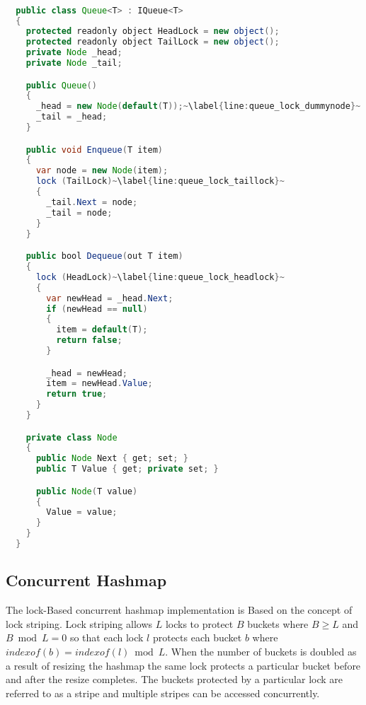 \begin{lstlisting}[label=lst:impl_queue_lock,
  caption={Lock Based Concurrent Queue Implementation},
  language=Java,  
  showspaces=false,
  showtabs=false,
  breaklines=true,
  showstringspaces=false,
  breakatwhitespace=true,
  commentstyle=\color{greencomments},
  keywordstyle=\color{bluekeywords},
  stringstyle=\color{redstrings},
  escapechar=~,
  morekeywords={atomic, retry, orelse, var, get, set, ref, out, readonly, virtual, override, lock}]  % Start your code-block

  public class Queue<T> : IQueue<T>
  {
    protected readonly object HeadLock = new object();
    protected readonly object TailLock = new object();
    private Node _head;
    private Node _tail;

    public Queue()
    {
      _head = new Node(default(T));~\label{line:queue_lock_dummynode}~
      _tail = _head;
    }

    public void Enqueue(T item)
    {
      var node = new Node(item);
      lock (TailLock)~\label{line:queue_lock_taillock}~
      {
        _tail.Next = node;
        _tail = node;
      }
    }

    public bool Dequeue(out T item)
    {
      lock (HeadLock)~\label{line:queue_lock_headlock}~
      {
        var newHead = _head.Next;
        if (newHead == null)
        {
          item = default(T);
          return false;
        }

        _head = newHead;
        item = newHead.Value;
        return true;
      }
    }

    private class Node
    {
      public Node Next { get; set; }
      public T Value { get; private set; }

      public Node(T value)
      {
        Value = value;
      }
    }
  }

\end{lstlisting}

\subsection{Concurrent Hashmap}
The lock-Based concurrent hashmap implementation is Based on the concept of lock striping. Lock striping allows $L$ locks to protect $B$ buckets where $B \geq L$ and $B \bmod L = 0$ so that each lock $l$ protects each bucket $b$ where $indexof(b) = indexof(l) \bmod L$\cite[p. 304]{herlihy2012art}. When the number of buckets is doubled as a result of resizing the hashmap the same lock protects a particular bucket before and after the resize completes. The buckets protected by a particular lock are referred to as a stripe and multiple stripes can be accessed concurrently.

